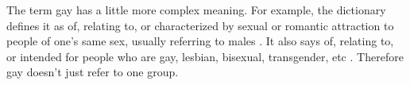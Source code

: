 The term gay has a little more complex meaning. For example, the dictionary 
defines it as of, relating to, or characterized by sexual or romantic 
attraction to people of one's same sex, usually referring to males 
\cite{gay-def}. It also says of, relating to, or intended for people who are 
gay, lesbian, bisexual, transgender, etc \cite{gay-def}. Therefore gay doesn’t 
just refer to one group.

